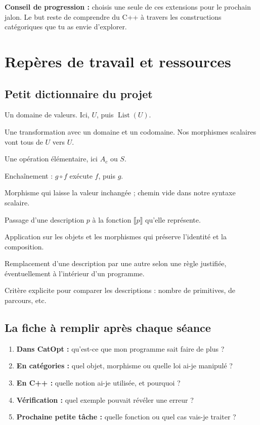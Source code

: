 \documentclass[11pt,a4paper]{article}
\newcommand{\List}{\operatorname{List}}
\newcommand{\sem}[1]{\llbracket #1\rrbracket}
\begin{document}
\textbf{Conseil de progression :} choisis une seule de ces extensions pour
le prochain jalon. Le but reste de comprendre du C++ à travers les
constructions catégoriques que tu as envie d'explorer.

\clearpage
\section{Repères de travail et ressources}
\label{sec:reperes}
\subsection{Petit dictionnaire du projet}
\begin{description}[style=nextline,leftmargin=0pt,labelindent=0pt,labelsep=0pt,
  labelwidth=0pt,font=\bfseries]
\item[Objet] Un domaine de valeurs. Ici, \(U\), puis \(\List(U)\).
\item[Morphisme] Une transformation avec un domaine et un codomaine.
Nos morphismes scalaires vont tous de \(U\) vers \(U\).
\item[Générateur] Une opération élémentaire, ici \(A_c\) ou \(S\).
\item[Composition] Enchaînement : \(g\circ f\) exécute \(f\), puis \(g\).
\item[Identité] Morphisme qui laisse la valeur inchangée ; chemin vide
dans notre syntaxe scalaire.
\item[Interprétation] Passage d'une description \(p\) à la fonction
\(\sem{p}\) qu'elle représente.
\item[Foncteur] Application sur les objets et les morphismes qui préserve
l'identité et la composition.
\item[Réécriture] Remplacement d'une description par une autre selon une
règle justifiée, éventuellement à l'intérieur d'un programme.
\item[Modèle de coût] Critère explicite pour comparer les descriptions :
nombre de primitives, de parcours, etc.
\end{description}

\subsection{La fiche à remplir après chaque séance}
\begin{enumerate}
\item \textbf{Dans CatOpt :} qu'est-ce que mon programme sait faire de plus ?
\item \textbf{En catégories :} quel objet, morphisme ou quelle loi ai-je manipulé ?
\item \textbf{En C++ :} quelle notion ai-je utilisée, et pourquoi ?
\item \textbf{Vérification :} quel exemple pouvait révéler une erreur ?
\item \textbf{Prochaine petite tâche :} quelle fonction ou quel cas vais-je traiter ?
\end{enumerate}
\end{document}
